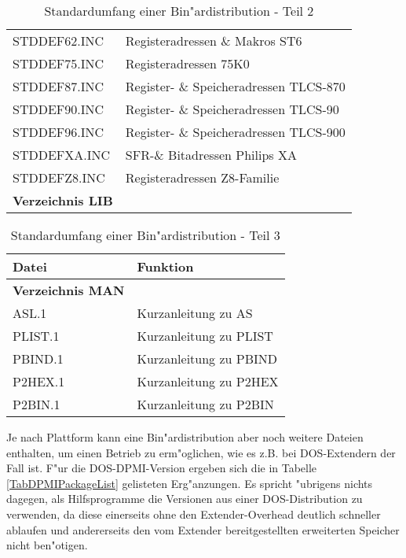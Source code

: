 \documentclass[12pt,a4paper,twoside]{report}
\begin{document}
\begin{table*}[htp]
\begin{center}
\begin{tabular}{|l|l|}
STDDEF62.INC      & Registeradressen \& Makros ST6 \\
STDDEF75.INC      & Registeradressen 75K0 \\
STDDEF87.INC      & Register- \& Speicheradressen TLCS-870 \\
STDDEF90.INC      & Register- \& Speicheradressen TLCS-90 \\
STDDEF96.INC      & Register- \& Speicheradressen TLCS-900 \\
STDDEFXA.INC      & SFR-\& Bitadressen Philips XA \\
STDDEFZ8.INC      & Registeradressen Z8-Familie \\
\hline
\hline
{\bf Verzeichnis LIB} & \\
\hline
\end{tabular}\end{center}
\caption{Standardumfang einer Bin"ardistribution - Teil 2
         \label{TabCommonPackageList2}}
\end{table*}

\begin{table*}[htp]
\begin{center}\begin{tabular}{|l|l|}
\hline
Datei             & Funktion \\
\hline
\hline
{\bf Verzeichnis MAN} & \\
\hline
ASL.1             & Kurzanleitung zu AS \\
PLIST.1           & Kurzanleitung zu PLIST \\
PBIND.1           & Kurzanleitung zu PBIND \\
P2HEX.1           & Kurzanleitung zu P2HEX \\
P2BIN.1           & Kurzanleitung zu P2BIN \\
\hline
\end{tabular}\end{center}
\caption{Standardumfang einer Bin"ardistribution - Teil 3
         \label{TabCommonPackageList3}}
\end{table*}

Je nach Plattform kann eine Bin"ardistribution aber noch weitere Dateien
enthalten, um einen Betrieb zu erm"oglichen, wie es z.B. bei DOS-Extendern
der Fall ist.  F"ur die DOS-DPMI-Version  ergeben
sich die in Tabelle \ref{TabDPMIPackageList} gelisteten Erg"anzungen.  Es
spricht "ubrigens nichts dagegen, als Hilfsprogramme die Versionen aus
einer DOS-Distribution zu verwenden, da diese einerseits ohne den
Extender-Overhead deutlich schneller ablaufen und andererseits den
vom Extender bereitgestellten erweiterten Speicher nicht ben"otigen.
\end{document}

